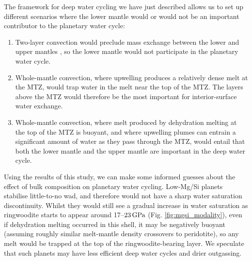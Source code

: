 The framework for deep water cycling we have just described allows us to set up different scenarios where the lower mantle would or would not be an important contributor to the planetary water cycle: %
\begin{enumerate}
    \item Two-layer convection would preclude mass exchange between the lower and upper mantles \citep[e.g.,][]{tackley_mantle_1995}, so the lower mantle would not participate in the planetary water cycle.
    \item Whole-mantle convection, where upwelling produces a relatively dense melt at the MTZ, would trap water in the melt near the top of the MTZ. The layers above the MTZ would therefore be the most important for interior-surface water exchange.
    \item Whole-mantle convection, where melt produced by dehydration melting at the top of the MTZ is buoyant, and where upwelling plumes can entrain a significant amount of water as they pass through the MTZ, would entail that both the lower mantle and the upper mantle are important in the deep water cycle.
\end{enumerate}


Using the results of this study, we can make some informed guesses about the effect of bulk composition on planetary water cycling. Low-Mg/Si planets stabilise little-to-no wad, and therefore would not have a sharp water saturation discontinuity. Whilst they would still see a gradual increase in water saturation as ringwoodite starts to appear around 17--$23\,{\rm GPa}$ (Fig. \ref{fig:mgsi_modality}), even if dehydration melting occurred in this shell, it may be negatively buoyant (assuming roughly similar melt-mantle density crossovers to peridotite), so any melt would be trapped at the top of the ringwoodite-bearing layer. We speculate that such planets may have less efficient deep water cycles and drier outgassing. 



